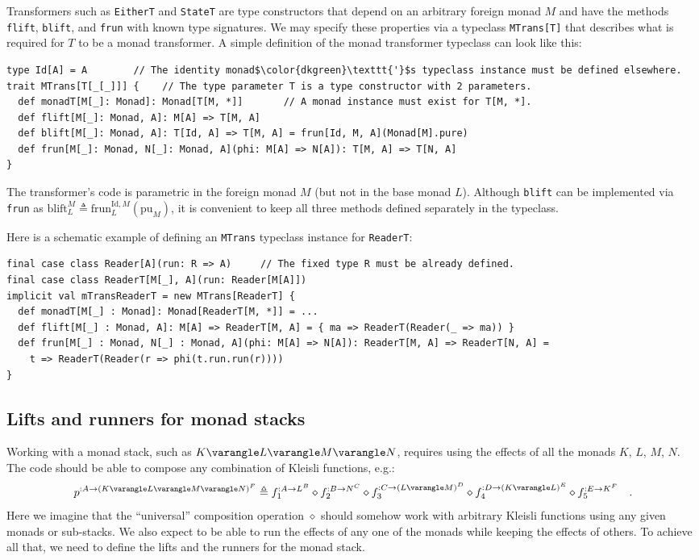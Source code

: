 Transformers such as \lstinline!EitherT! and \lstinline!StateT!
are type constructors that depend on an arbitrary foreign monad $M$
and have the methods \lstinline!flift!, \lstinline!blift!, and \lstinline!frun!
with known type signatures. We may specify these properties via a
typeclass \lstinline!MTrans[T]! that describes what is required for
$T$ to be a monad transformer. A simple definition of the monad transformer
typeclass can look like this:
\begin{lstlisting}[mathescape=true]
type Id[A] = A        // The identity monad$\color{dkgreen}\texttt{'}$s typeclass instance must be defined elsewhere.
trait MTrans[T[_[_]]] {    // The type parameter T is a type constructor with 2 parameters.
  def monadT[M[_]: Monad]: Monad[T[M, *]]       // A monad instance must exist for T[M, *].
  def flift[M[_]: Monad, A]: M[A] => T[M, A]
  def blift[M[_]: Monad, A]: T[Id, A] => T[M, A] = frun[Id, M, A](Monad[M].pure)
  def frun[M[_]: Monad, N[_]: Monad, A](phi: M[A] => N[A]): T[M, A] => T[N, A]
}
\end{lstlisting}
The transformer\textsf{'}s code is parametric in the foreign monad $M$ (but
not in the base monad $L$). Although \lstinline!blift! can be implemented
via \lstinline!frun! as $\text{blift}_{L}^{M}\triangleq\text{frun}_{L}^{\text{Id},M}(\text{pu}_{M})$,
it is convenient to keep all three methods defined separately in the
typeclass.

Here is a schematic example of defining an \lstinline!MTrans! typeclass
instance for \lstinline!ReaderT!:
\begin{lstlisting}
final case class Reader[A](run: R => A)     // The fixed type R must be already defined.
final case class ReaderT[M[_], A](run: Reader[M[A]])
implicit val mTransReaderT = new MTrans[ReaderT] {
  def monadT[M[_] : Monad]: Monad[ReaderT[M, *]] = ...
  def flift[M[_] : Monad, A]: M[A] => ReaderT[M, A] = { ma => ReaderT(Reader(_ => ma)) }
  def frun[M[_] : Monad, N[_] : Monad, A](phi: M[A] => N[A]): ReaderT[M, A] => ReaderT[N, A] =
    t => ReaderT(Reader(r => phi(t.run.run(r))))
}
\end{lstlisting}


\subsection{Lifts and runners for monad stacks}

Working with a monad stack, such as $K\varangle L\varangle M\varangle N$,
requires using the effects of all the monads $K$, $L$, $M$, $N$.
The code should be able to compose any combination of Kleisli functions,
e.g.:
\[
p^{:A\rightarrow(K\varangle L\varangle M\varangle N)^{F}}\triangleq f_{1}^{:A\rightarrow L^{B}}\diamond f_{2}^{:B\rightarrow N^{C}}\diamond f_{3}^{:C\rightarrow(L\varangle M)^{D}}\diamond f_{4}^{:D\rightarrow(K\varangle L)^{E}}\diamond f_{5}^{:E\rightarrow K^{F}}\quad.
\]
Here we imagine that the \textsf{``}universal\textsf{''} composition operation $\diamond$
should somehow work with arbitrary Kleisli functions using any given
monads or sub-stacks. We also expect to be able to run the effects
of any one of the monads while keeping the effects of others. To achieve
all that, we need to define the lifts and the runners for the monad
stack.

